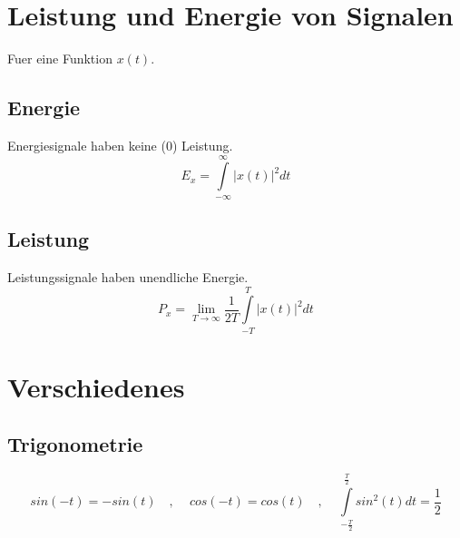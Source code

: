 \documentclass[10pt,a4paper]{article}
\begin{document}
\section{Leistung und Energie von Signalen}
Fuer eine Funktion $x(t)$.
\subsection{Energie}
Energiesignale haben keine ($0$) Leistung.
\[
E_x = \int\limits_{-\infty}^\infty \left| x(t) \right|^2 dt
\]
\subsection{Leistung}
Leistungssignale haben unendliche Energie.
\[
P_x = \lim\limits_{T \rightarrow \infty} \frac{1}{2T} \int\limits_{-T}^T \left| x(t) \right|^2 dt
\]

\section{Verschiedenes}
\subsection{Trigonometrie}
\[sin(-t) = -sin(t) \,\,\,\,\,\,,\,\,\,\,\,\,\, cos(-t) = cos(t) \,\,\,\,\,\,,\,\,\,\,\,\,\, \int\limits_{- \frac{T}{2}}^{\frac{T}{2}} sin^2(t) dt = \frac{1}{2}\]
\end{document}
